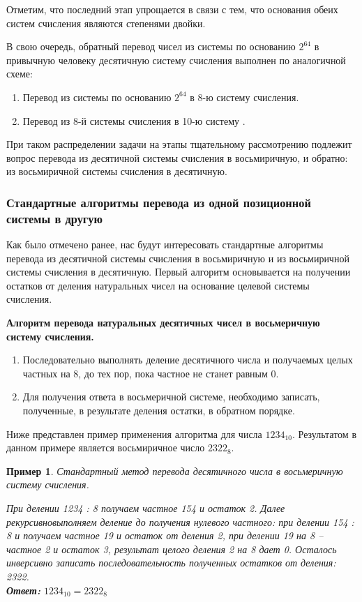 \documentclass[14pt, russian]{scrartcl}
\newcounter{cExample}
\newtheorem{Example}{Пример}[cExample]
\begin{document}
Отметим, что последний этап упрощается в связи с тем, что основания обеих систем счисления являются степенями двойки. 

В свою очередь, обратный перевод чисел из системы по основанию $2^{64}$ в привычную человеку десятичную систему счисления выполнен по аналогичной схеме:
\begin{enumerate}
\item Перевод из системы по основанию $2^{64}$ в 8-ю систему счисления.
\item Перевод из 8-й системы счисления в 10-ю систему .
\end{enumerate}

При таком распределении задачи на этапы тщательному рассмотрению подлежит вопрос перевода из десятичной системы счисления в восьмиричную, и обратно: из восьмиричной системы счисления в десятичную.

\subsubsection{Стандартные алгоритмы перевода из одной позиционной системы в другую}
Как было отмечено ранее, нас будут интересовать стандартные алгоритмы перевода из десятичной системы счисления в восьмиричную и из восьмиричной системы счисления в десятичную. Первый алгоритм основывается на получении остатков от деления натуральных чисел на основание целевой системы счисления. 

\textbf{Алгоритм перевода натуральных десятичных чисел в восьмеричную систему счисления.}
\begin{enumerate}
\item Последовательно выполнять деление десятичного числа и получаемых целых частных на 8, до тех пор, пока частное не станет равным 0.
\item Для получения ответа в восьмеричной системе, необходимо записать, полученные, в результате деления остатки, в обратном порядке.
\end{enumerate}

Ниже представлен пример применения алгоритма для числа $1234_{10}$. Результатом в данном примере является восьмиричное число $2322_8$.

\begin{Example}\label{Example:MathFont02}
Стандартный метод перевода десятичного числа в восьмеричную систему счисления.

\textnormal{При делении 1234 : 8 получаем частное 154 и остаток 2.
Далее рекурсивновыполняем деление до получения нулевого частного:
при делении 154 : 8 и получаем частное 19 и остаток от деления 2, при делении 19 на 8 -- частное 2 и остаток 3, результат целого деления 2 на 8 дает 0.
Осталось инверсивно записать последовательность полученных остатков от деления: 2322.}\\  
\textbf{Ответ:} $1234_{10} = 2322_8$ 
\end{Example} 
\end{document}

